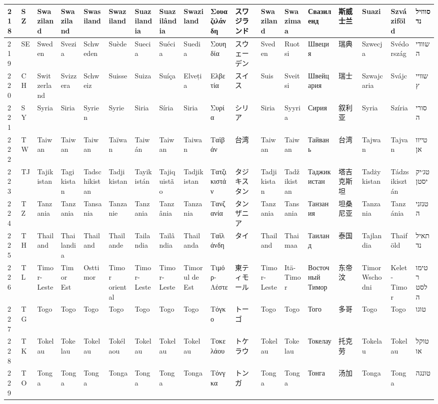 \begin{longtable}{|l|l|l|l|l|l|l|l|l|l|l|l|l|l|l|l|l|l|}
218 & SZ & Swaziland & Swaziland & Swasiland & Swaziland & Suazilandia & Suazilândia & Swaziland & Σουαζιλάνδη & スワジランド & Swaziland & Swazimaa & Свазиленд & 斯威士兰 & Suazi & Szváziföld & סווזילנד \\ \hline 
219 & SE & Sweden & Svezia & Schweden & Suède & Suecia & Suécia & Suedia & Σουηδία & スウェーデン & Sveden & Ruotsi & Швеция & 瑞典 & Szwecja & Svédország & שוודיה \\ \hline 
220 & CH & Switzerland & Svizzera & Schweiz & Suisse & Suiza & Suíça & Elveția & Ελβετία & スイス & Suis & Sveitsi & Швейцария & 瑞士 & Szwajcaria & Svájc & שווייץ \\ \hline 
221 & SY & Syria & Siria & Syrien & Syrie & Siria & Síria & Siria & Συρία & シリア & Siria & Syyria & Сирия & 叙利亚 & Syria & Szíria & סוריה \\ \hline 
222 & TW & Taiwan & Taiwan & Taiwan & Taïwan & Taiwán & Taiwan & Taiwan & Ταϊβάν & 台湾 & Taiwan & Taiwan & Тайвань & 台湾 & Tajwan & Tajvan & טייוואן \\ \hline 
223 & TJ & Tajikistan & Tagikistan & Tadschikistan & Tadjikistan & Tayikistán & Tajiquistão & Tadjikistan & Τατζικιστάν & タジキスタン & Tadjikistan & Tadžikistan & Таджикистан & 塔吉克斯坦 & Tadżykistan & Tádzsikisztán & טג׳יקיסטן \\ \hline 
224 & TZ & Tanzania & Tanzania & Tansania & Tanzanie & Tanzania & Tanzânia & Tanzania & Τανζανία & タンザニア & Tanzania & Tansania & Танзания & 坦桑尼亚 & Tanzania & Tanzánia & טנזניה \\ \hline 
225 & TH & Thailand & Thailandia & Thailand & Thaïlande & Tailandia & Tailândia & Thailanda & Ταϊλάνδη & タイ & Thailand & Thaimaa & Таиланд & 泰国 & Tajlandia & Thaiföld & תאילנד \\ \hline 
226 & TL & Timor-Leste & Timor Est & Osttimor & Timor oriental & Timor-Leste & Timor-Leste & Timorul de Est & Τιμόρ-Λέστε & 東ティモール & Timor-Leste & Itä-Timor & Восточный Тимор & 东帝汶 & Timor Wschodni & Kelet-Timor & טימור לסטה \\ \hline 
227 & TG & Togo & Togo & Togo & Togo & Togo & Togo & Togo & Τόγκο & トーゴ & Togo & Togo & Того & 多哥 & Togo & Togo & טוגו \\ \hline 
228 & TK & Tokelau & Tokelau & Tokelau & Tokélaou & Tokelau & Tokelau & Tokelau & Τοκελάου & トケラウ & Tokelau & Tokelau & Токелау & 托克劳 & Tokelau & Tokelau & טוקלאו \\ \hline 
229 & TO & Tonga & Tonga & Tonga & Tonga & Tonga & Tonga & Tonga & Τόνγκα & トンガ & Tonga & Tonga & Тонга & 汤加 & Tonga & Tonga & טונגה \\ \hline 

\end{longtable}

